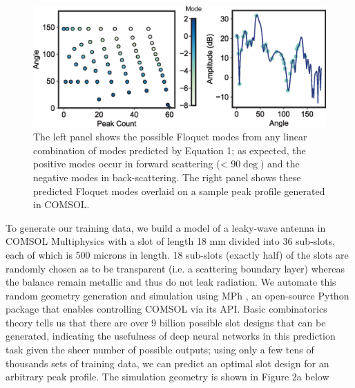 \documentclass[11pt]{article}
\begin{document}
\begin{figure}[H]
	\centering
	\includegraphics[width=6in]{figures/fig4_labeled2.eps}
	\caption{The left panel shows the possible Floquet modes from any linear combination of modes predicted by Equation 1; as expected, the positive modes occur in forward scattering (< 90$\deg$) and the negative modes in back-scattering. The right panel shows these predicted Floquet modes overlaid on a sample peak profile generated in COMSOL.}
\end{figure}


\noindent To generate our training data, we build a model of a leaky-wave antenna in COMSOL Multiphysics with a slot of length 18 mm divided into 36 sub-slots, each of which is 500 microns in length. 18 sub-slots (exactly half) of the slots are randomly chosen as to be transparent (i.e. a scattering boundary layer) whereas the balance remain metallic and thus do not leak radiation. We automate this random geometry generation and simulation using MPh \cite{john_hennig_2022_6312347}, an open-source Python package that enables controlling COMSOL via its API. Basic combinatorics theory tells us that there are over 9 billion possible slot designs that can be generated, indicating the usefulness of deep neural networks in this prediction task given the sheer number of possible outputs; using only a few tens of thousands sets of training data, we can predict an optimal slot design for an arbitrary peak profile. The simulation geometry is shown in Figure 2a below \\
\end{document}
